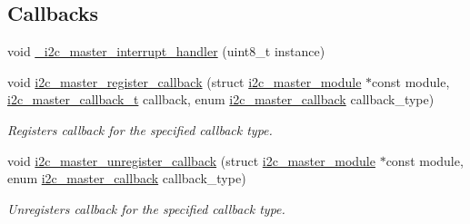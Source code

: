 \subsection*{Callbacks}
\begin{DoxyCompactItemize}
\item 
void \mbox{\hyperlink{group__asfdoc__sam0__sercom__i2c__group_ga5ba2356881237729e03a8c4637b96306}{\+\_\+i2c\+\_\+master\+\_\+interrupt\+\_\+handler}} (uint8\+\_\+t instance)
\item 
void \mbox{\hyperlink{group__asfdoc__sam0__sercom__i2c__group_gaf3216a045490437ec87ba14ffeee5e7b}{i2c\+\_\+master\+\_\+register\+\_\+callback}} (struct \mbox{\hyperlink{structi2c__master__module}{i2c\+\_\+master\+\_\+module}} $\ast$const module, \mbox{\hyperlink{group__asfdoc__sam0__sercom__i2c__group_ga0ef653593dbacc01735c61e59ec3f0da}{i2c\+\_\+master\+\_\+callback\+\_\+t}} callback, enum \mbox{\hyperlink{group__asfdoc__sam0__sercom__i2c__group_ga844ac2694772642cfee08a29c50bf054}{i2c\+\_\+master\+\_\+callback}} callback\+\_\+type)
\begin{DoxyCompactList}\small\item\em Registers callback for the specified callback type. \end{DoxyCompactList}\item 
void \mbox{\hyperlink{group__asfdoc__sam0__sercom__i2c__group_ga7432de8165fe68a4fdb1919a33b58250}{i2c\+\_\+master\+\_\+unregister\+\_\+callback}} (struct \mbox{\hyperlink{structi2c__master__module}{i2c\+\_\+master\+\_\+module}} $\ast$const module, enum \mbox{\hyperlink{group__asfdoc__sam0__sercom__i2c__group_ga844ac2694772642cfee08a29c50bf054}{i2c\+\_\+master\+\_\+callback}} callback\+\_\+type)
\begin{DoxyCompactList}\small\item\em Unregisters callback for the specified callback type. \end{DoxyCompactList}\end{DoxyCompactItemize}
